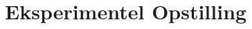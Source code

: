 \documentclass[A2_main.tex]{subfiles}
\begin{document}
\section{Eksperimentel Opstilling}
\end{document}
